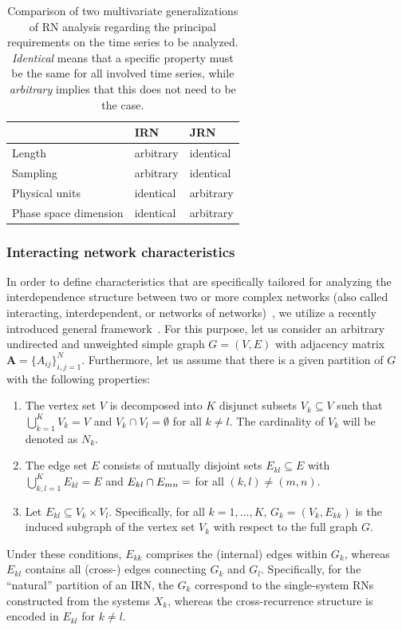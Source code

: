 \documentclass[graybox]{svmult}
\begin{document}
\begin{table}[tb]
\caption[Multivariate generalizations of recurrence network analysis]{Comparison of two multivariate generalizations of RN analysis regarding the principal requirements on the time series to be analyzed. \emph{Identical} means that a specific property must be the same for all involved time series, while \emph{arbitrary} implies that this does not need to be the case.}
\centering
\setlength{\tabcolsep}{0.2cm}
\begin{tabular}{lll}
\hline
& IRN & JRN \\
\hline
Length & arbitrary & identical \\
Sampling & arbitrary & identical \\
Physical units & identical & arbitrary \\
Phase space dimension & identical & arbitrary \\
\hline
\end{tabular}
\label{tab:multivariate_rns}
\end{table}%


\subsubsection{Interacting network characteristics}\label{sec:irn_measures}

In order to define characteristics that are specifically tailored for analyzing the interdependence structure between two or more complex networks (also called interacting, interdependent, or networks of networks)~\cite{Buldyrev2010}, we utilize a recently introduced general framework~\cite{Donges2011EPJB,Wiedermann2013}. For this purpose, let us consider an arbitrary undirected and unweighted simple graph $G=(V,E)$ with adjacency matrix $\textbf{A}=\{A_{ij}\}_{i,j=1}^N$. Furthermore, let us assume that there is a given partition of $G$ with the following properties:
\begin{enumerate}
\item The vertex set $V$ is decomposed into $K$ disjunct subsets $V_k \subseteq V$ such that $\bigcup_{k=1}^K V_k = V$ and $V_k \cap V_l = \emptyset$ for all $k \neq l$. The cardinality of $V_k$ will be denoted as $N_k$. 
\item The edge set $E$ consists of mutually disjoint sets $E_{kl} \subseteq E$ with $\bigcup_{k,l=1}^K E_{kl} = E$ and $E_{kl} \cap E_{mn}=\empty$ for all $(k,l) \neq (m,n)$.
\item Let $E_{kl}\subseteq V_k\times V_l$. Specifically, for all $k=1,\dots,K$, $G_k=(V_k,E_{kk})$ is the induced subgraph of the vertex set $V_k$ with respect to the full graph $G$.
\end{enumerate}
\noindent
Under these conditions, $E_{kk}$ comprises the (internal) edges within $G_k$, whereas $E_{kl}$ contains all (cross-) edges connecting $G_k$ and $G_l$. Specifically, for the ``natural'' partition of an IRN, the $G_k$ correspond to the single-system RNs constructed from the systems $X_k$, whereas the cross-recurrence structure is encoded in $E_{kl}$ for $k \neq l$.
\end{document}
